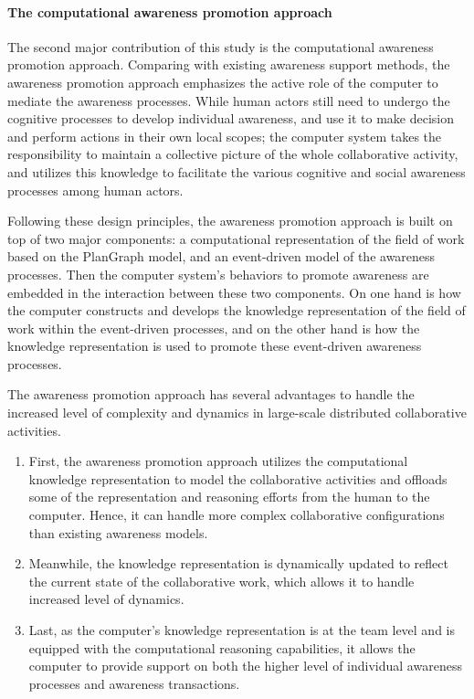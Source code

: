\paragraph*{The computational awareness promotion approach} %
\label{par:the_awareness_promotion_approach}
The second major contribution of this study is the computational awareness promotion approach. Comparing with existing awareness support methods, the awareness promotion approach emphasizes the active role of the computer to mediate the awareness processes. While human actors still need to undergo the cognitive processes to develop individual awareness, and use it to make decision and perform actions in their own local scopes; the computer system takes the responsibility to maintain a collective picture of the whole collaborative activity, and utilizes this knowledge to facilitate the various cognitive and social awareness processes among human actors. 

Following these design principles, the awareness promotion approach is built on top of two major components: a computational representation of the field of work based on the PlanGraph model, and an event-driven model of the awareness processes. Then the computer system's behaviors to promote awareness are embedded in the interaction between these two components. On one hand is how the computer constructs and develops the knowledge representation of the field of work within the event-driven processes, and on the other hand is how the knowledge representation is used to promote these event-driven awareness processes.

The awareness promotion approach has several advantages to handle the increased level of complexity and dynamics in large-scale distributed collaborative activities.

\begin{enumerate}
	\item First, the awareness promotion approach utilizes the computational knowledge representation to model the collaborative activities and offloads some of the representation and reasoning efforts from the human to the computer. Hence, it can  handle more complex collaborative configurations than existing awareness models.
	\item Meanwhile, the knowledge representation is dynamically updated to reflect the current state of the collaborative work, which allows it to handle increased level of dynamics.
	\item Last, as the computer's knowledge representation is at the team level and is equipped with the computational reasoning capabilities, it allows the computer to provide support on both the higher level of individual awareness processes and awareness transactions.
\end{enumerate}

